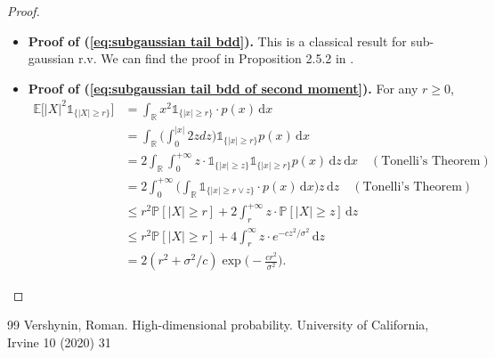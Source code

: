 \documentclass[10pt,a4paper]{amsart}
\newcommand{\ind}{\mathds{1}}
\newcommand{\diff}{\,\mathrm{d}}
\begin{document}
\begin{proof}
\begin{itemize}
    \item \textbf{Proof of (\ref{eq:subgaussian tail bdd}).}
    This is a classical result for sub-gaussian r.v. We can find the proof in Proposition 2.5.2 in \cite{Vershynin_2018}. 

\item \textbf{Proof of (\ref{eq:subgaussian tail bdd of second moment}).}
For any $r\geq0$, 
\begin{align*}
    \mathbb{E} \big[ |X|^2\ind_{\{|X|\geq r\}} \big] &= \int_{\mathbb{R}} x^2 \ind_{\{|x|\geq r\}} \cdot p(x) \!\diff x \\
    & = \int_{\mathbb{R}} \Big( \int_0^{|x|} 2z dz\Big) \ind_{\{|x|\geq r\}} p(x) \!\diff x \\
    &= 2\int_{\mathbb{R}}  \int_0^{+\infty} z\cdot \ind_{\{|x|\geq z\}}  \ind_{\{|x|\geq r\}} p(x) \!\diff z \!\diff x \quad (\text{Tonelli's Theorem}) \\
    &= 2\int_0^{+\infty} \Big( \int_{\mathbb{R}}\ind_{\{|x| \geq r\vee z\}}\cdot  p(x) \!\diff x\Big)z \!\diff z \quad (\text{Tonelli's Theorem})\\ 
    & \leq r^2 \mathbb{P}[|X| \geq r] + 2 \int_r^{+\infty} z \cdot \mathbb{P}[|X| \geq z] \!\diff z \\
    &\leq r^2 \mathbb{P}[|X| \geq r] + 4 \int_r^{\infty} z \cdot e^{-cz^2/\sigma^2}  \!\diff z \\
    &= 2 (r^2 + \sigma^2/c) \exp\big(-\frac{cr^2}{\sigma^2}\big) .
\end{align*}
\end{itemize}

\end{proof}


\begin{thebibliography}{99}
 Vershynin, Roman. High-dimensional probability. University of California, Irvine 10 (2020) 31
\end{thebibliography}
\end{document}
